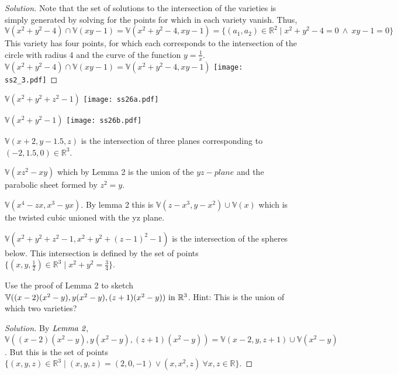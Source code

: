 \documentclass{article}
\newenvironment{problem}[2][Problem]{\begin{trivlist}
\item[\hskip \labelsep {\bfseries #1}\hskip \labelsep {\bfseries #2.}]}{\end{trivlist}}
\newenvironment{solution}{\begin{proof}[Solution]}{\end{proof}}
\begin{document}
\begin{solution}
Note that the set of solutions to the intersection of the varieties is simply generated by solving for the points for which in each variety vanish. Thus, $\mathbb{V}(x^2 +y^2 -4)\cap\mathbb{V}(xy-1)=\mathbb{V}(x^2 +y^2 -4,xy-1) = \{(a_1,a_2)\in \mathbb{R}^2 \mid x^2 +y^2 - 4=0 \ \land \ xy - 1 = 0\}$ This variety has four points, for which each corresponds to the intersection of the circle with radius 4 and the curve of the function $y=\frac{1}{x}$. \newline
$\mathbb{V}(x^2 +y^2 -4)\cap\mathbb{V}(xy-1)=\mathbb{V}(x^2 +y^2 -4,xy-1)$ \newline
\texttt{[image: ss2\_3.pdf]}
\end{solution}
\newpage
\begin{problem}{(4a)}
$\mathbb{V}(x^2+y^2+z^2-1)$ \newline
\texttt{[image: ss26a.pdf]}
\end{problem}
\begin{problem}{(4b)}
$\mathbb{V}(x^2+y^2-1)$ \newline
\texttt{[image: ss26b.pdf]}
\end{problem}
\begin{problem}{(4c)}
$\mathbb{V}(x+2,y-1.5,z)$ \newline
is the intersection of three planes corresponding to $(-2,1.5,0)\in\mathbb{R}^3$.
\end{problem}
\newpage
\begin{problem}{(4d)}
$\mathbb{V}(xz^2-xy)$  which by Lemma 2 is the union of the $yz-plane$ and the parabolic sheet formed by $z^2 = y$.
\end{problem}
\begin{problem}{(4e)}
$\mathbb{V}(x^4-zx, x^3 - yx)$. By lemma 2 this is  $\mathbb{V}(z-x^3,y-x^2) \cup \mathbb{V}(x)$ which is the twisted cubic unioned with the yz plane.
\end{problem}
\begin{problem}{(4f)}
$\mathbb{V}(x^2+y^2+z^2-1, x^2+y^2+(z-1)^2-1)$ is the intersection of the spheres below. This intersection is defined by the set of points $\{(x,y,\frac{1}{2})\in \mathbb{R}^3 \mid x^2 + y^2 = \frac{3}{4}\}$.
\end{problem}
\begin{problem}{(5)}
Use the proof of Lemma 2 to sketch $\mathbb{V}((x-2)(x^2 -y),y(x^2 -y),(z+1)(x^2 -y)) \ \textnormal{in} \ \mathbb{R}^3$. Hint: This is the union of which two varieties?
\end{problem}
\begin{solution}
By $\emph{Lemma 2}$, $\mathbb{V}((x-2)(x^2 -y),y(x^2 -y),(z+1)(x^2 -y)) = \mathbb{V}(x-2,y,z+1) \cup \mathbb{V}(x^2 -y)$.  But this is the set of points $\{(x,y,z)\in\mathbb{R}^3 \mid (x,y,z) = (2,0,-1) \lor (x,x^2,z) \ \forall x,z\in \mathbb{R}\}$.
\end{solution}
\end{document}

